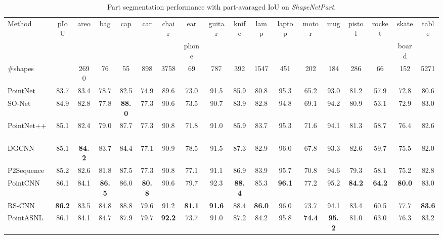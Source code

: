 \documentclass[10pt,twocolumn,letterpaper]{article}
\begin{document}
\begin{table*}[!htp]
		\renewcommand\tabcolsep{2.5pt} 
		\caption{Part segmentation performance with part-avaraged IoU on \textit{ShapeNetPart}.}
		\begin{center}
			\begin{tabular}{l|c|cccccccccccccccc}
				\hline
				
				Method &pIoU &areo& bag& cap& car &chair&ear  & guitar &knife& lamp& laptop &motor &mug &pistol& rocket& skate  &table\\
				& && & &  && phone &  && &  & & && &board   &\\
				\hline
				\#shapes& &2690& 76& 55& 898 &3758&{69} & 787 &392& 1547& 451 &202 &184 &286& 66& 152 &5271\\
				\hline
				PointNet~\cite{pointnet} &83.7& 83.4 &78.7 &82.5 &74.9 &89.6 &73.0 &91.5 &85.9& 80.8 &95.3& 65.2 &93.0 &81.2& 57.9 &72.8&80.6\\
				SO-Net~\cite{So-net}&84.9& 82.8& 77.8& \bf{88.0} &77.3& 90.6& 73.5 &90.7 &83.9 &82.8& 94.8 &69.1 &94.2& 80.9& 53.1& 72.9& 83.0\\
				PointNet++~\cite{pointnet2} &85.1 &82.4 &79.0 &87.7& 77.3 &90.8 &71.8 &91.0& 85.9& 83.7& 95.3 &71.6& 94.1& 81.3& 58.7& 76.4& 82.6\\
				DGCNN~\cite{DGCNN}&85.1 &\bf{84.2} &83.7& 84.4& 77.1 &90.9 &78.5 &91.5& 87.3 &82.9 &96.0 &67.8 &93.3 &82.6& 59.7& 75.5& 82.0\\
				P2Sequence~\cite{Point2Sequence} & 85.2& 82.6 &81.8 &87.5& 77.3 &90.8& 77.1 &91.1 &86.9 &83.9 &95.7 &70.8 &94.6 &79.3& 58.1& 75.2& 82.8\\
				PointCNN~\cite{PointCNN}& 86.1& 84.1& \bf{86.5}& 86.0&\bf{80.8} &90.6& 79.7 &92.3 &\bf{88.4}& 85.3& \bf{96.1} &77.2 &95.2 &\bf{84.2} &\bf{64.2} &\bf{80.0}& 83.0\\
				RS-CNN~\cite{rscnn} &\bf{86.2}& 83.5 &84.8& 88.8 &79.6 &91.2 &\bf{81.1}& \bf{91.6} &88.4& \bf{86.0 }&96.0& 73.7 &94.1 &83.4 &60.5& 77.7& \bf{83.6}\\
				\hline
				PointASNL & {{86.1}}	&84.1&	84.7&	87.9	&79.7&\bf{92.2}	&73.7&	91.0	&87.2&	84.2	&95.8&	\bf{74.4}	&\bf{95.2}&	81.0	&63.0&	76.3	&83.2 \\
				\hline
			\end{tabular}
		\end{center}
		
		\label{tab:ShapeNet}
	\end{table*}
	
\end{document}
